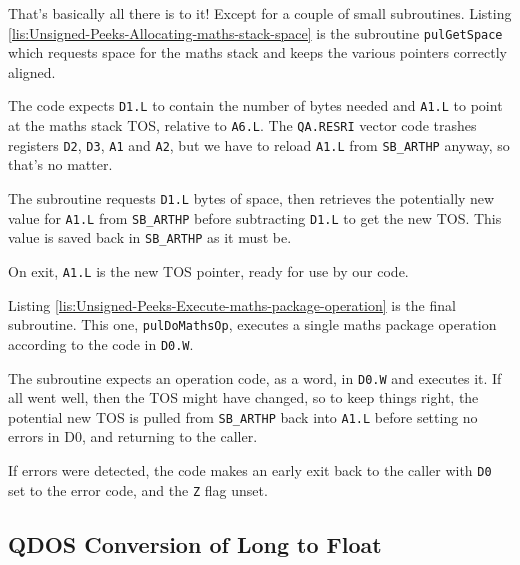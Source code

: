 That's basically all there is to it! Except for a couple of small
subroutines. Listing \ref{lis:Unsigned-Peeks-Allocating-maths-stack-space}
is the subroutine \texttt{pulGetSpace} which requests space for the
maths stack and keeps the various pointers correctly aligned.



The code expects \texttt{D1.L} to contain the number of bytes needed
and \texttt{A1.L} to point at the maths stack TOS, relative to \texttt{A6.L}.
The \texttt{QA.RESRI} vector code trashes registers \texttt{D2}, \texttt{D3},
\texttt{A1} and \texttt{A2}, but we have to reload \texttt{A1.L} from
\texttt{SB\_ARTHP} anyway, so that's no matter. 

The subroutine requests \texttt{D1.L} bytes of space, then retrieves
the potentially new value for \texttt{A1.L} from \texttt{SB\_ARTHP}
before subtracting \texttt{D1.L} to get the new TOS. This value is
saved back in \texttt{SB\_ARTHP} as it must be.

On exit, \texttt{A1.L} is the new TOS pointer, ready for use by our
code.

Listing \ref{lis:Unsigned-Peeks-Execute-maths-package-operation}
is the final subroutine. This one, \texttt{pulDoMathsOp}, executes
a single maths package operation according to the code in \texttt{D0.W}.



The subroutine expects an operation code, as a word, in \texttt{D0.W}
and executes it. If all went well, then the TOS might have changed,
so to keep things right, the potential new TOS is pulled from \texttt{SB\_ARTHP}
back into \texttt{A1.L} before setting no errors in D0, and returning
to the caller.

If errors were detected, the code makes an early exit back to the
caller with \texttt{D0} set to the error code, and the \texttt{Z}
flag unset.

\subsection{QDOS Conversion of Long to Float}

